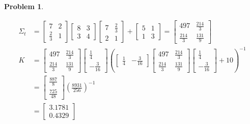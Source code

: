 \documentclass{article}
\newtheorem{problem}{Problem}
\begin{document}
\begin{problem}
\begin{itemize}
\begin{tcolorbox}
\begin{align*}
 \Sigma_t &= \begin{bmatrix}
        7 & 2
        \\
        \frac{2}{3} & 1
       \end{bmatrix} \begin{bmatrix}
       8 & 3 \\
       3 & 4
       \end{bmatrix}\begin{bmatrix}
        7 & \frac{2}{3} 
        \\
         2 & 1
       \end{bmatrix}  + \begin{bmatrix}
       5 & 1 \\
       1 & 3
       \end{bmatrix}
       =
       \begin{bmatrix}
        497 & \frac{214}{3}
        \\
        \frac{214}{3} & \frac{131}{9}
       \end{bmatrix}
       \\
K &= \begin{bmatrix}
        497 & \frac{214}{3}
        \\
        \frac{214}{3} & \frac{131}{9}
       \end{bmatrix}
       \begin{bmatrix}
        \frac{1}{4}
        \\
        -\frac{3}{16}
       \end{bmatrix}
       \left(
       \begin{bmatrix}
        \frac{1}{4}
        &
        -\frac{3}{16}
       \end{bmatrix}
       \begin{bmatrix}
        497 & \frac{214}{3}
        \\
        \frac{214}{3} & \frac{131}{9}
       \end{bmatrix}
       \begin{bmatrix}
        \frac{1}{4}
        \\
        -\frac{3}{16}
       \end{bmatrix}
       +
       10
       \right)^{-1}
       \\
       &=
       \begin{bmatrix}
        \frac{887}{8}
        \\
        \frac{725}{48}
       \end{bmatrix}
       \left(
       \frac{8931}{256}
       \right)^{-1}
       \\
       &=
        \begin{bmatrix}
        3.1781
        \\
        0.4329
       \end{bmatrix}
\end{align*}



\end{tcolorbox}

\end{itemize}


\end{problem}
\end{document}
